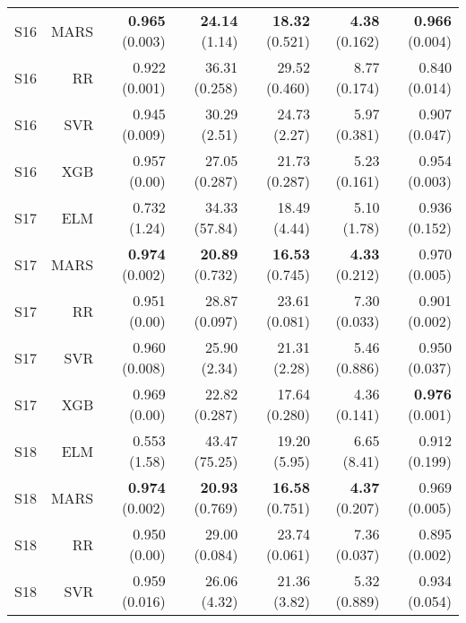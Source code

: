 \begin{table}
\begin{tabular}{rrrrrrr}
    S16 &      MARS &                { \bf 0.965} (0.003) &       { \bf 24.14} (1.14) &    { \bf 18.32} (0.521) &     { \bf 4.38} (0.162) &  { \bf 0.966} (0.004) \\
    S16 &        RR &                       0.922 (0.001) &             36.31 (0.258) &           29.52 (0.460) &            8.77 (0.174) &         0.840 (0.014) \\
    S16 &       SVR &                       0.945 (0.009) &              30.29 (2.51) &            24.73 (2.27) &            5.97 (0.381) &         0.907 (0.047) \\
    S16 &       XGB &                        0.957 (0.00) &             27.05 (0.287) &           21.73 (0.287) &            5.23 (0.161) &         0.954 (0.003) \\
    S17 &       ELM &                        0.732 (1.24) &             34.33 (57.84) &            18.49 (4.44) &             5.10 (1.78) &         0.936 (0.152) \\
    S17 &      MARS &                { \bf 0.974} (0.002) &      { \bf 20.89} (0.732) &    { \bf 16.53} (0.745) &     { \bf 4.33} (0.212) &         0.970 (0.005) \\
    S17 &        RR &                        0.951 (0.00) &             28.87 (0.097) &           23.61 (0.081) &            7.30 (0.033) &         0.901 (0.002) \\
    S17 &       SVR &                       0.960 (0.008) &              25.90 (2.34) &            21.31 (2.28) &            5.46 (0.886) &         0.950 (0.037) \\
    S17 &       XGB &                        0.969 (0.00) &             22.82 (0.287) &           17.64 (0.280) &            4.36 (0.141) &  { \bf 0.976} (0.001) \\
    S18 &       ELM &                        0.553 (1.58) &             43.47 (75.25) &            19.20 (5.95) &             6.65 (8.41) &         0.912 (0.199) \\
    S18 &      MARS &                { \bf 0.974} (0.002) &      { \bf 20.93} (0.769) &    { \bf 16.58} (0.751) &     { \bf 4.37} (0.207) &         0.969 (0.005) \\
    S18 &        RR &                        0.950 (0.00) &             29.00 (0.084) &           23.74 (0.061) &            7.36 (0.037) &         0.895 (0.002) \\
    S18 &       SVR &                       0.959 (0.016) &              26.06 (4.32) &            21.36 (3.82) &            5.32 (0.889) &         0.934 (0.054) \\

\end{tabular}
\end{table}
